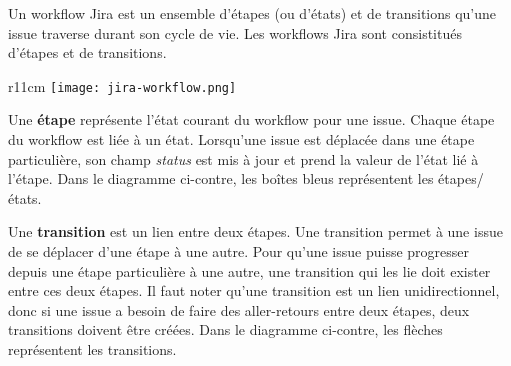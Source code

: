 Un workflow Jira est un ensemble d'étapes (ou d'états) et de transitions qu'une
issue traverse durant son cycle de vie. Les workflows Jira sont consistitués
d'étapes et de transitions.

\begin{wrapfigure}[13]{r}{11cm}
  \texttt{[image: jira-workflow.png]}
\end{wrapfigure}

Une \textbf{étape} représente l'état courant du workflow pour une issue.
Chaque étape du workflow est liée à un état. 
Lorsqu'une issue est déplacée dans une étape particulière, son champ
\textit{status} est mis à jour et prend la valeur de l'état lié à l'étape.
Dans le diagramme ci-contre, les boîtes bleus représentent les étapes/états.

Une \textbf{transition} est un lien entre deux étapes. Une transition permet
à une issue de se déplacer d'une étape à une autre. Pour qu'une issue puisse
progresser depuis une étape particulière à une autre, une transition qui les
lie doit exister entre ces deux étapes.
Il faut noter qu'une transition est un lien unidirectionnel, donc si une
issue a besoin de faire des aller-retours entre deux étapes, deux
transitions doivent être créées.
Dans le diagramme ci-contre, les flèches représentent les transitions.

